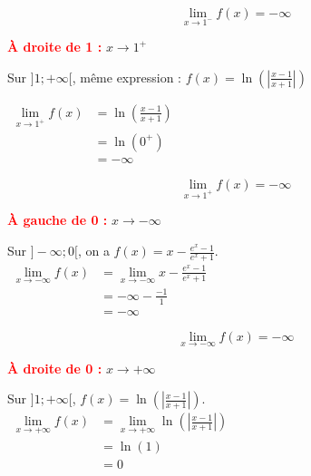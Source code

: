 \documentclass[12pt,a4paper]{article}
\begin{document}
\begin{enumerate}
\begin{resultbox}
\[
\boxed{\lim_{x \to 1^-} f(x) = -\infty}
\]
\end{resultbox}

\textcolor{red}{\textbf{À droite de 1 :}} \( x \to 1^+ \)

Sur \( ]1 ; +\infty[ \), même expression : \( f(x) = \ln\left( \left| \frac{x - 1}{x + 1} \right| \right) \)

\(
\begin{aligned}
    \lim\limits_{x \to 1^+} f(x) &= \ln\left( \frac{x - 1}{x + 1} \right)\\ 
                                 &= \ln(0^+)\\
                                 &= -\infty
\end{aligned}
\)

\begin{resultbox}
\[
\boxed{\lim_{x \to 1^+} f(x) = -\infty}
\]
\end{resultbox}

\textcolor{red}{\textbf{À gauche de 0 :}} \( x \to -\infty \)

Sur \( ]-\infty ; 0[ \), on a \( f(x) = x - \frac{e^x - 1}{e^x + 1} \).\\

\(
\begin{aligned}
    \lim\limits_{x\to -\infty}f(x)&=\lim\limits_{x\to -\infty}x-\frac{e^x - 1}{e^x + 1}\\
                                  &= -\infty - \frac{-1}{1}\\
                                  &=-\infty
\end{aligned}
\)

\begin{resultbox}
\[
\boxed{\lim_{x \to -\infty} f(x) = -\infty}
\]
\end{resultbox}

\textcolor{red}{\textbf{À droite de 0 :}} \( x \to +\infty \)

Sur \( ]1 ; +\infty[ \), \( f(x) = \ln\left( \left| \frac{x - 1}{x + 1} \right| \right) \).\\

\(
\begin{aligned}
    \lim\limits_{x\to +\infty}f(x)&=\lim\limits_{x\to +\infty}\ln\left( \left| \frac{x - 1}{x + 1} \right| \right)\\
                                  &= \ln(1)\\
                                  &=0
\end{aligned}
\)


\end{enumerate}
\end{document}
